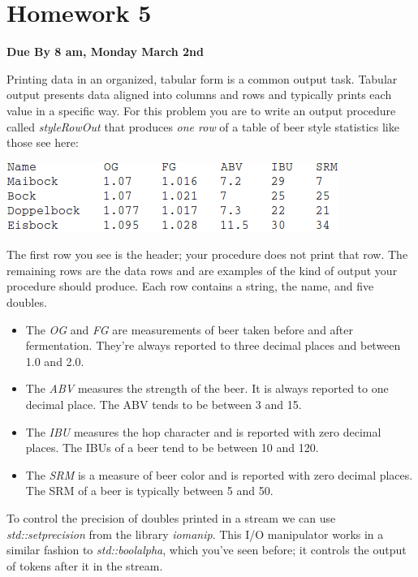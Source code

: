 \documentclass[]{tufte-handout}
\begin{document}
\newpage

\section{Homework 5}

\begin{center}
\textbf{Due By 8 am, Monday March 2nd}
\end{center}

Printing data in an organized, tabular form is a common output task.  Tabular output presents data aligned into columns and rows and typically prints each value in a specific way.  For this problem you are to write an output procedure called \textit{styleRowOut} that produces \textit{one row} of a table of beer style statistics like those see here:

\vspace{.1in}
\begin{center}
\includegraphics[scale=.5]{tabExample.png}
\end{center}
\vspace{.1in}

The first row you see is the header; your procedure does not print that row. The remaining rows are the data rows and are examples of the kind of output your procedure should produce. Each row contains a string, the name, and five doubles.
\begin{itemize}
\item  The \textit{OG} and \textit{FG} are measurements of beer taken before and after fermentation. They're always reported to three decimal places and between 1.0 and 2.0. 
\item The \textit{ABV} measures the strength of the beer. It is always reported to one decimal place. The ABV tends to be between 3 and 15.
\item The \textit{IBU} measures the hop character and is reported with zero decimal places. The IBUs of a beer tend to be between 10 and 120.
\item The \textit{SRM} is a measure of beer color and is reported with zero decimal places. The SRM of a beer is typically between 5 and 50. 
\end{itemize}
To control the precision of doubles printed in a stream we can use \textit{std::setprecision} from the library \textit{iomanip}. This I/O manipulator works in a similar fashion to \textit{std::boolalpha}, which you've seen before; it controls the output of tokens after it in the stream. 
\end{document}
